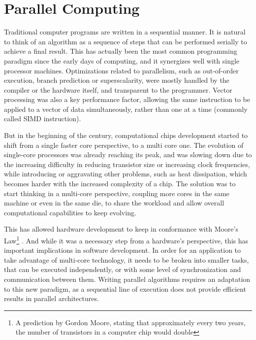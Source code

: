 \documentclass[main.tex]{subfiles}
\begin{document}
\section{Parallel Computing}

Traditional computer programs are written in a sequential manner. It is natural to think of an algorithm as a sequence of steps that can be performed serially to achieve a final result. This has actually been the most common programming paradigm since the early days of computing, and it synergizes well with single processor machines. Optimizations related to parallelism, such as out-of-order execution, branch prediction or superscalarity, were mostly handled by the compiler or the hardware itself, and transparent to the programmer. Vector processing was also a key performance factor, allowing the same instruction to be applied to a vector of data simultaneously, rather than one at a time (commonly called \ac{SIMD} instruction).

But in the beginning of the  century, computational chips development started to shift from a single faster core perspective, to a multi core one. The evolution of single-core processors was already reaching its peak, and was slowing down due to the increasing difficulty in reducing transistor size or increasing clock frequencies, while introducing or aggravating other problems, such as heat dissipation, which becomes harder with the increased complexity of a chip. The solution was to start thinking in a multi-core perspective, coupling more cores in the same machine or even in the same die, to share the workload and allow overall computational capabilities to keep evolving.

This has allowed hardware development to keep in conformance with Moore's Law\footnote{A prediction by Gordon Moore, stating that approximately every two years, the number of transistors in a computer chip would double} . And while it was a necessary step from a hardware's perspective, this has important implications in software development. In order for an application to take advantage of multi-core technology, it needs to be broken into smaller tasks, that can be executed independently, or with some level of synchronization and communication between them. Writing parallel algorithms requires an adaptation to this new paradigm, as a sequential line of execution does not provide efficient results in parallel architectures.
\end{document}
